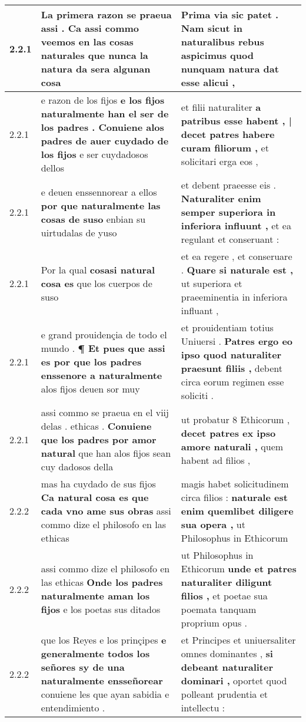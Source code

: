 \begin{tabular}{|p{1cm}|p{6.5cm}|p{6.5cm}|}
2.2.1 & La primera razon se praeua assi . \textbf{ Ca assi commo veemos en las cosas naturales } que nunca la natura da sera algunan cosa & Prima via sic patet . \textbf{ Nam sicut in naturalibus rebus aspicimus } quod nunquam natura dat esse alicui , \\\hline
2.2.1 & e razon de los fijos \textbf{ e los fijos naturalmente han el ser de los padres . Conuiene alos padres de auer cuydado de los fijos } e ser cuydadosos dellos & et filii naturaliter \textbf{ a patribus esse habent , | decet patres habere curam filiorum , } et solicitari erga eos , \\\hline
2.2.1 & e deuen enssennorear a ellos \textbf{ por que naturalmente las cosas de suso } enbian su uirtudalas de yuso & et debent praeesse eis . \textbf{ Naturaliter enim semper superiora in inferiora influunt , } et ea regulant et conseruant : \\\hline
2.2.1 & Por la qual \textbf{ cosasi natural cosa es } que los cuerpos de suso & et ea regere , et conseruare . \textbf{ Quare si naturale est , } ut superiora et praeeminentia in inferiora influant , \\\hline
2.2.1 & e grand prouidençia de todo el mundo . \textbf{ ¶ Et pues que assi es por que los padres enssenore a naturalmente } alos fijos deuen sor muy & et prouidentiam totius Uniuersi . \textbf{ Patres ergo eo ipso quod naturaliter praesunt filiis , } debent circa eorum regimen esse soliciti . \\\hline
2.2.1 & assi commo se praeua en el viij delas . ethicas . \textbf{ Conuiene que los padres por amor natural } que han alos fijos sean cuy dadosos della & ut probatur 8 Ethicorum , \textbf{ decet patres ex ipso amore naturali , } quem habent ad filios , \\\hline
2.2.2 & mas ha cuydado de sus fijos \textbf{ Ca natural cosa es que cada vno ame sus obras } assi commo dize el philosofo en las ethicas & magis habet solicitudinem circa filios : \textbf{ naturale est enim quemlibet diligere sua opera , } ut Philosophus in Ethicorum \\\hline
2.2.2 & assi commo dize el philosofo en las ethicas \textbf{ Onde los padres naturalmente aman los fijos } e los poetas sus ditados & ut Philosophus in Ethicorum \textbf{ unde et patres naturaliter diligunt filios , } et poetae sua poemata tanquam proprium opus . \\\hline
2.2.2 & que los Reyes e los prinçipes \textbf{ e generalmente todos los señores sy de una naturalmente ensseñorear } conuiene les que ayan sabidia e entendimiento . & et Principes et uniuersaliter omnes dominantes , \textbf{ si debeant naturaliter dominari , } oportet quod polleant prudentia et intellectu : \\\hline

\end{tabular}
